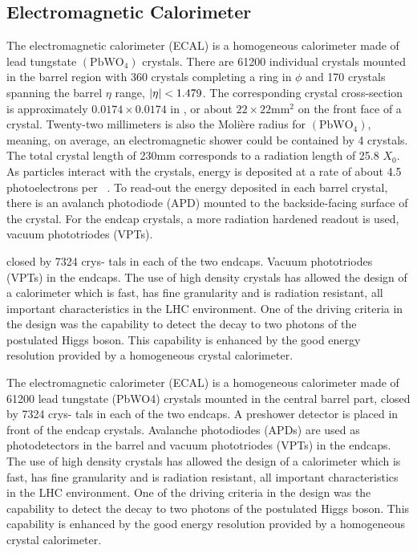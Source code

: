 \subsection{Electromagnetic Calorimeter}
The electromagnetic calorimeter (ECAL) is a homogeneous calorimeter made of lead 
tungstate $(\textrm{PbWO}_{4})$ crystals. There are 61200 individual crystals mounted
in the barrel region with 360 crystals completing a ring in $\phi$ and 170 crystals
spanning the barrel $\eta$ range, $\lvert\eta\rvert < 1.479$. The corresponding crystal
cross-section is approximately $0.0174 \times 0.0174$ in \etaphi, or about $22 \times 22 \textrm{mm}^{2}$
on the front face of a crystal. Twenty-two millimeters is also the Moli\`ere radius
for $(\textrm{PbWO}_{4})$, meaning, on average, an electromagnetic shower could be
contained by 4 crystals. The total crystal length of 230mm corresponds to a
radiation length of 25.8 $X_{0}$. 
As particles interact with the crystals, energy is deposited at a rate of about 4.5
photoelectrons per \MeV~\cite{dafinei_auffray_lecoq_schneegans_1994}.
To read-out the energy deposited in each barrel
crystal, there is an avalanch photodiode (APD) mounted to the backside-facing surface
of the crystal. For the endcap crystals, a more radiation hardened readout is used,
vacuum phototriodes (VPTs).






closed by 7324 crys- tals in each of the two endcaps. Vacuum phototriodes (VPTs) in the endcaps. The use of high density crystals has allowed the design of a calorimeter which is fast, has fine granularity and is radiation resistant, all important characteristics in the LHC environment. One of the driving criteria in the design was the capability to detect the decay to two photons of the postulated Higgs boson. This capability is enhanced by the good energy resolution provided by a homogeneous crystal calorimeter.

The electromagnetic calorimeter (ECAL) is a homogeneous calorimeter made of 61200 lead tungstate (PbWO4) crystals mounted in the central barrel part, closed by 7324 crys- tals in each of the two endcaps. A preshower detector is placed in front of the endcap crystals. Avalanche photodiodes (APDs) are used as photodetectors in the barrel and vacuum phototriodes (VPTs) in the endcaps. The use of high density crystals has allowed the design of a calorimeter which is fast, has fine granularity and is radiation resistant, all important characteristics in the LHC environment. One of the driving criteria in the design was the capability to detect the decay to two photons of the postulated Higgs boson. This capability is enhanced by the good energy resolution provided by a homogeneous crystal calorimeter.

